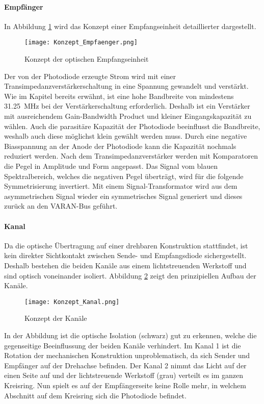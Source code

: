 \paragraph{Empfänger}
In Abbildung \ref{fig:Konzept_Empfaenger} wird das Konzept einer Empfangseinheit detaillierter dargestellt.

\begin{figure}[h]
	\centering
	\texttt{[image: Konzept\_Empfaenger.png]}
	\caption{Konzept der optischen Empfangseinheit}\label{fig:Konzept_Empfaenger}
\end{figure}

Der von der Photodiode erzeugte Strom wird mit einer Transimpedanzverstärkerschaltung in eine Spannung gewandelt und verstärkt. Wie im Kapitel  bereits erwähnt, ist eine hohe Bandbreite von mindestens \SI{31.25}{MHz} bei der Verstärkerschaltung erforderlich. Deshalb ist ein Verstärker mit ausreichendem Gain-Bandwidth Product und kleiner Eingangskapazität zu wählen. Auch die parasitäre Kapazität der Photodiode beeinflusst die Bandbreite, weshalb auch diese möglichst klein gewählt werden muss. Durch eine negative Biasspannung an der Anode der Photodiode kann die Kapazität nochmals reduziert werden.
\newline
Nach dem Transimpedanzverstärker werden mit Komparatoren die Pegel in Amplitude und Form angepasst. Das Signal vom blauen Spektralbereich, welches die negativen Pegel überträgt, wird für die folgende Symmetrisierung invertiert. Mit einem Signal-Transformator wird aus dem asymmetrischen Signal wieder ein symmetrisches Signal generiert und dieses zurück an den VARAN-Bus geführt.

\paragraph{Kanal}
Da die optische Übertragung auf einer drehbaren Konstruktion stattfindet, ist kein direkter Sichtkontakt zwischen Sende- und Empfangsdiode sichergestellt. Deshalb bestehen die beiden Kanäle aus einem lichtstreuenden Werkstoff und sind optisch voneinander isoliert. Abbildung \ref{fig:Konzept_Kanal} zeigt den prinzipiellen Aufbau der Kanäle.

\begin{figure}[h]
	\centering
	\texttt{[image: Konzept\_Kanal.png]}
	\caption{Konzept der Kanäle}\label{fig:Konzept_Kanal}
\end{figure}

In der Abbildung ist die optische Isolation (schwarz) gut zu erkennen, welche die gegenseitige Beeinflussung der beiden Kanäle verhindert. Im Kanal 1 ist die Rotation der mechanischen Konstruktion unproblematisch, da sich Sender und Empfänger auf der Drehachse befinden. Der Kanal 2 nimmt das Licht auf der einen Seite auf und der lichtstreuende Werkstoff (grau) verteilt es im ganzen Kreisring. Nun spielt es auf der Empfängerseite keine Rolle mehr, in welchem Abschnitt auf dem Kreisring sich die Photodiode befindet.

